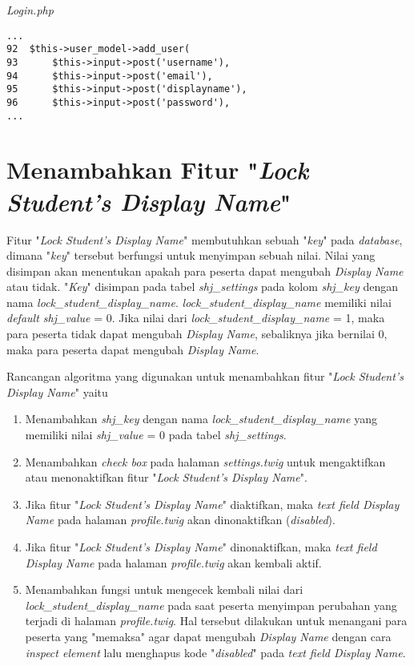 \textit{Login.php}
\begin{lstlisting}[basicstyle=\ttfamily, frame=single,
columns=fullflexible, keepspaces=true, breaklines=true]
...
92	$this->user_model->add_user(
93		$this->input->post('username'),
94		$this->input->post('email'),
95		$this->input->post('displayname'),
96		$this->input->post('password'),
...
\end{lstlisting}

\section{Menambahkan Fitur "\textit{Lock Student's Display Name}"}
Fitur "\textit{Lock Student's Display Name}" membutuhkan sebuah "\textit{key}" pada \textit{database}, dimana "\textit{key}" tersebut berfungsi untuk menyimpan sebuah nilai. Nilai yang disimpan akan menentukan apakah para peserta dapat mengubah \textit{Display Name} atau tidak. "\textit{Key}" disimpan pada tabel \textit{shj\_settings} pada kolom \textit{shj\_key} dengan nama \textit{lock\_student\_display\_name}. \textit{lock\_student\_display\_name} memiliki nilai \textit{default shj\_value} = 0. Jika nilai dari \textit{lock\_student\_display\_name} = 1, maka para peserta tidak dapat mengubah \textit{Display Name}, sebaliknya jika bernilai 0, maka para peserta dapat mengubah \textit{Display Name}.

Rancangan algoritma yang digunakan untuk menambahkan fitur "\textit{Lock Student's Display Name}" yaitu
\begin{enumerate}
	\item Menambahkan \textit{shj\_key} dengan nama \textit{lock\_student\_display\_name} yang memiliki nilai \textit{shj\_value} = 0 pada tabel \textit{shj\_settings}.
	\item Menambahkan \textit{check box} pada halaman \textit{settings.twig} untuk mengaktifkan atau menonaktifkan fitur "\textit{Lock Student's Display Name}".
	\item Jika fitur "\textit{Lock Student's Display Name}" diaktifkan, maka \textit{text field Display Name} pada halaman \textit{profile.twig} akan dinonaktifkan (\textit{disabled}).
	\item Jika fitur "\textit{Lock Student's Display Name}" dinonaktifkan, maka \textit{text field Display Name} pada halaman \textit{profile.twig} akan kembali aktif.
	\item Menambahkan fungsi untuk mengecek kembali nilai dari \textit{lock\_student\_display\_name} pada saat peserta menyimpan perubahan yang terjadi di halaman \textit{profile.twig}. Hal tersebut dilakukan untuk menangani para peserta yang "memaksa" agar dapat mengubah \textit{Display Name} dengan cara \textit{inspect element} lalu menghapus kode "\textit{disabled}" pada \textit{text field Display Name}.
\end{enumerate}

